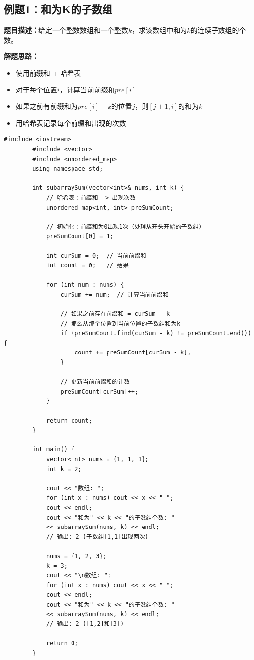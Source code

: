 \documentclass[12pt,a4paper]{article}
\begin{document}
	\subsection{例题1：和为K的子数组}
	
	\textbf{题目描述：}给定一个整数数组和一个整数$k$，求该数组中和为$k$的连续子数组的个数。
	
	\textbf{解题思路：}
	\begin{itemize}
		\item 使用前缀和 + 哈希表
		\item 对于每个位置$i$，计算当前前缀和$pre[i]$
		\item 如果之前有前缀和为$pre[i]-k$的位置$j$，则$[j+1, i]$的和为$k$
		\item 用哈希表记录每个前缀和出现的次数
	\end{itemize}
	
	\begin{lstlisting}[caption={例题1：和为K的子数组}]
		#include <iostream>
		#include <vector>
		#include <unordered_map>
		using namespace std;
		
		int subarraySum(vector<int>& nums, int k) {
			// 哈希表：前缀和 -> 出现次数
			unordered_map<int, int> preSumCount;
			
			// 初始化：前缀和为0出现1次（处理从开头开始的子数组）
			preSumCount[0] = 1;
			
			int curSum = 0;  // 当前前缀和
			int count = 0;   // 结果
			
			for (int num : nums) {
				curSum += num;  // 计算当前前缀和
				
				// 如果之前存在前缀和 = curSum - k
				// 那么从那个位置到当前位置的子数组和为k
				if (preSumCount.find(curSum - k) != preSumCount.end()) {
					count += preSumCount[curSum - k];
				}
				
				// 更新当前前缀和的计数
				preSumCount[curSum]++;
			}
			
			return count;
		}
		
		int main() {
			vector<int> nums = {1, 1, 1};
			int k = 2;
			
			cout << "数组: ";
			for (int x : nums) cout << x << " ";
			cout << endl;
			cout << "和为" << k << "的子数组个数: " 
			<< subarraySum(nums, k) << endl;
			// 输出: 2 (子数组[1,1]出现两次)
			
			nums = {1, 2, 3};
			k = 3;
			cout << "\n数组: ";
			for (int x : nums) cout << x << " ";
			cout << endl;
			cout << "和为" << k << "的子数组个数: " 
			<< subarraySum(nums, k) << endl;
			// 输出: 2 ([1,2]和[3])
			
			return 0;
		}
	\end{lstlisting}
	
\end{document}
